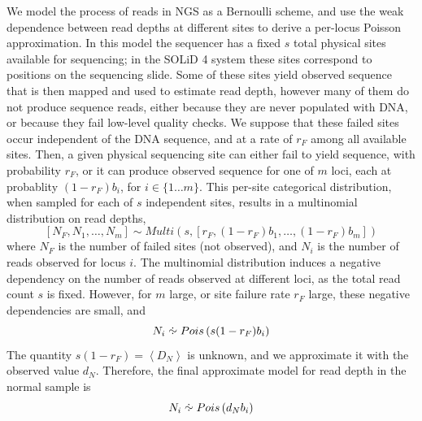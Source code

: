 \documentclass[thesis.tex]{subfiles}
\begin{document}
We model the process of reads in \gls{NGS} as a Bernoulli scheme, and use the weak dependence between read depths at different sites to derive a per-locus Poisson approximation.  In this model the sequencer has a fixed $s$ total physical sites available for sequencing; in the SOLiD 4 system these sites correspond to positions on the sequencing slide.  Some of these sites yield observed sequence that is then mapped and used to estimate read depth, however many of them do not produce sequence reads, either because they are never populated with DNA, or because they fail low-level quality checks.  We suppose that these failed sites occur independent of the DNA sequence, and at a rate of $r_F$ among all available sites.  Then, a given physical sequencing site can either fail to yield sequence, with probability $r_F$, or it can produce observed sequence for one of $m$ loci, each at probablity $(1-r_F)b_i$, for $i \in \{1 \dots m\}$.  This per-site categorical distribution, when sampled for each of $s$ independent sites, results in a multinomial distribution on read depths,
\begin{equation}
\left[N_F, N_1, \dots, N_m\right] \sim Multi\left(s, \left[r_F, (1-r_F)b_1, \dots, (1-r_F)b_m\right]\right)
\end{equation}
where $N_F$ is the number of failed sites (not observed), and $N_i$ is the number of reads observed for locus $i$.  The multinomial distribution induces a negative dependency on the number of reads observed at different loci, as the total read count $s$ is fixed.  However, for $m$ large, or site failure rate $r_F$ large\cite{McDonald1980}, these negative dependencies are small, and 
\begin{equation}
  N_i \approxdist Pois\left(s (1-r_F) b_i\right)
\end{equation}
The quantity $s(1-r_F) = \left<D_N\right>$ is unknown, and we approximate it with the observed value $d_N$.  Therefore, the final approximate model for read depth in the normal sample is
\begin{equation}
  N_i \approxdist Pois\left(d_N b_i\right) \label{eq:comp_cnv_Npois}
\end{equation}
\end{document}
